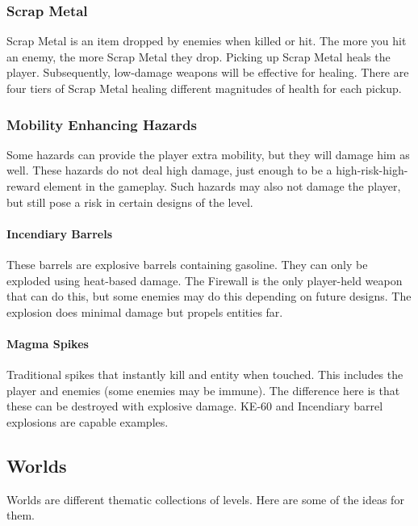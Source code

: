 \documentclass[12pt]{article}
\begin{document}
\subsubsection{Scrap Metal}

Scrap Metal is an item dropped by enemies when killed or hit. The more you hit an enemy, the more Scrap Metal they drop. Picking up Scrap Metal heals the player. Subsequently, low-damage weapons will be effective for healing. There are four tiers of Scrap Metal healing different magnitudes of health for each pickup. 

\subsubsection{Mobility Enhancing Hazards}

Some hazards can provide the player extra mobility, but they will damage him as well. These hazards do not deal high damage, just enough to be a high-risk-high-reward element in the gameplay. Such hazards may also not damage the player, but still pose a risk in certain designs of the level.

\paragraph{Incendiary Barrels} 

These barrels are explosive barrels containing gasoline. They can only be exploded using heat-based damage. The Firewall is the only player-held weapon that can do this, but some enemies may do this depending on future designs. The explosion does minimal damage but propels entities far. 

\paragraph{Magma Spikes}

Traditional spikes that instantly kill and entity when touched. This includes the player and enemies (some enemies may be immune). The difference here is that these can be destroyed with explosive damage. KE-60 and Incendiary barrel explosions are capable examples. 

\subsection{Worlds}

Worlds are different thematic collections of levels. Here are some of the ideas for them.
\end{document}
